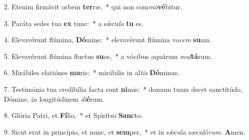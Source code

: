 2. Etenim firmávit orbem \textbf{ter}ræ,~*  qui non com\textit{mo}\textbf{vé}bitur.\

3. Paráta sedes tua \textbf{ex} tunc:~*  a sǽcu\textit{lo} \textbf{tu} es.\

4. Elevavérunt flúmina, \textbf{Dó}mine:~*  elevavérunt flúmina vo\textit{cem} \textbf{su}am.\

5. Elevavérunt flúmina fluctus \textbf{su}os,~*  a vócibus aquárum \textit{mul}\textbf{tá}rum.\

6. Mirábiles elatiónes \textbf{ma}ris:~*  mirábilis in al\textit{tis} \textbf{Dó}minus.\

7. Testimónia tua credibília facta sunt \textbf{ni}mis:~*  domum tuam decet sanctitúdo, Dómine, in longitúdinem \textit{di}\textbf{é}rum.\

8. Glória Patri, et \textbf{Fí}lio,~*  et Spirítu\textit{i} \textbf{Sanc}to.\

9. Sicut erat in princípio, et nunc, et \textbf{sem}per,~*  et in sǽcula sæculó\textit{rum}. \textbf{A}men.\

